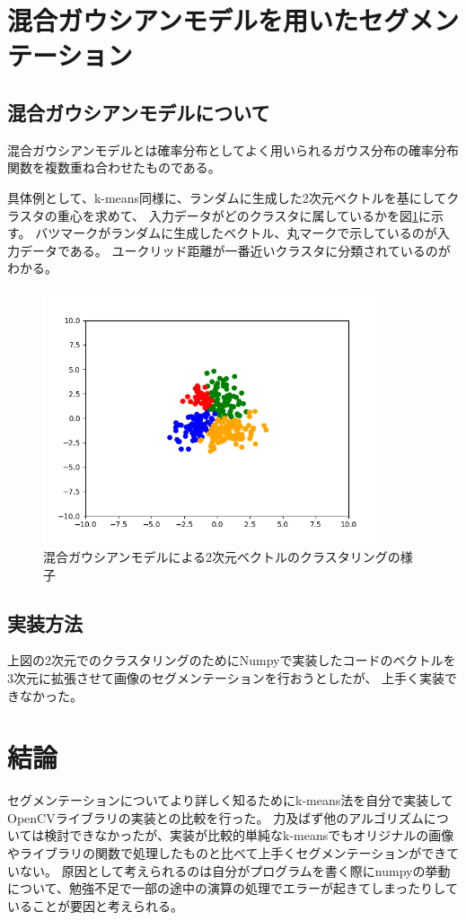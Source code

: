 \documentclass[11pt,a4j]{jsarticle}
\begin{document}
    \section{混合ガウシアンモデルを用いたセグメンテーション}
    \subsection{混合ガウシアンモデルについて}
    混合ガウシアンモデルとは確率分布としてよく用いられるガウス分布の確率分布関数を複数重ね合わせたものである。

    具体例として、k-means同様に、ランダムに生成した2次元ベクトルを基にしてクラスタの重心を求めて、
    入力データがどのクラスタに属しているかを図\ref{fig:ex-gauss}に示す。
    バツマークがランダムに生成したベクトル、丸マークで示しているのが入力データである。
    ユークリッド距離が一番近いクラスタに分類されているのがわかる。


    \begin{figure}[H]
        \centering
        \includegraphics[clip,width=10.0cm]{img/gauss_5000.png}
        \caption{混合ガウシアンモデルによる2次元ベクトルのクラスタリングの様子\label{fig:ex-gauss}}
    \end{figure} 
    \subsection{実装方法}
    上図の2次元でのクラスタリングのためにNumpyで実装したコードのベクトルを3次元に拡張させて画像のセグメンテーションを行おうとしたが、
    上手く実装できなかった。

    \section{結論}
    セグメンテーションについてより詳しく知るためにk-means法を自分で実装してOpenCVライブラリの実装との比較を行った。
    力及ばず他のアルゴリズムについては検討できなかったが、実装が比較的単純なk-meansでもオリジナルの画像やライブラリの関数で処理したものと比べて上手くセグメンテーションができていない。
    原因として考えられるのは自分がプログラムを書く際にnumpyの挙動について、勉強不足で一部の途中の演算の処理でエラーが起きてしまったりしていることが要因と考えられる。
    
\end{document}
